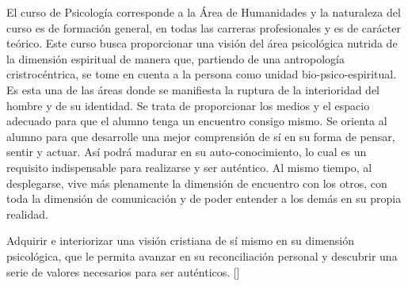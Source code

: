 


\begin{syllabus}


\begin{justification}
El curso de Psicología corresponde a la Área de Humanidades y la naturaleza del curso es de formación general, en todas las carreras profesionales y es de carácter teórico.
Este curso busca proporcionar una visión del área psicológica nutrida de la dimensión espiritual de manera que, partiendo de una antropología cristrocéntrica, se tome en cuenta a la persona como unidad bio-psico-espiritual. Es esta una de las áreas donde se manifiesta la ruptura de la interioridad del hombre y de su identidad.
Se trata de proporcionar los medios y el espacio adecuado para que el alumno tenga un encuentro consigo mismo. Se orienta al alumno para que desarrolle una mejor comprensión de sí en su forma de pensar, sentir y actuar. Así podrá madurar en su auto-conocimiento, lo cual es un requisito indispensable para realizarse y ser auténtico. Al mismo tiempo, al desplegarse, vive más plenamente la dimensión de encuentro con los otros, con toda la dimensión de comunicación y de poder entender a los demás en su propia realidad.
\end{justification}

\begin{goals}
\item Adquirir e interiorizar una visión cristiana de sí mismo en su dimensión psicológica, que le permita avanzar en su reconciliación personal y descubrir una serie de valores necesarios para ser auténticos. [\Usage]
\end{goals}

\begin{outcomes}
    \item {}
    \item {}
    \item {}
    \item {}
\end{outcomes}

\begin{competences}
    \item {}
    \item {}
    \item {} 
    \item {}
\end{competences}


\end{syllabus}
